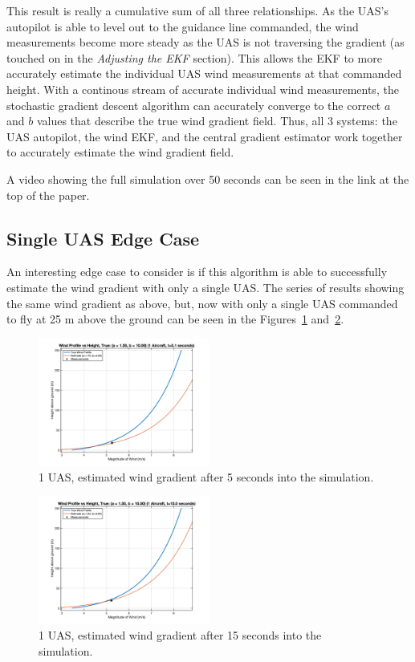 This result is really a cumulative sum of all three relationships. As the UAS's autopilot is able to level out to the guidance line commanded, 
the wind measurements become more steady as the UAS is not traversing the gradient (as touched on in the \textit{Adjusting the EKF} section).
This allows the EKF to more accurately estimate the individual UAS wind measurements at that commanded height. 
With a continous stream of accurate individual wind measurements, the stochastic gradient descent algorithm can accurately converge to the correct $a$ and $b$ values that describe the true wind gradient field.
Thus, all 3 systems: the UAS autopilot, the wind EKF, and the central gradient estimator work together to accurately estimate the wind gradient field.

A video showing the full simulation over 50 seconds can be seen in the link at the top of the paper.

\subsection{Single UAS Edge Case}

An interesting edge case to consider is if this algorithm is able to successfully estimate the wind gradient with only a single UAS.
The series of results showing the same wind gradient as above, but, now with only a single UAS commanded to fly at 25 m above the ground can be seen in the Figures~\ref{fig:uas_traj_one_5} and~\ref{fig:uas_traj_one_15}.

\begin{figure}[h]
    \centering
    \includegraphics[width=0.5\textwidth]{images/single_5_sec.png}
    \caption{1 UAS, estimated wind gradient after 5 seconds into the simulation.}
    \label{fig:uas_traj_one_5}
\end{figure}

\begin{figure}[h]
    \centering
    \includegraphics[width=0.5\textwidth]{images/single_15_sec.png}
    \caption{1 UAS, estimated wind gradient after 15 seconds into the simulation.}
    \label{fig:uas_traj_one_15}
\end{figure}

